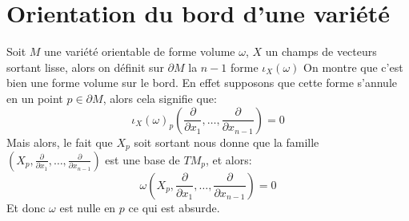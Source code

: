    \section{Orientation du bord d'une variété}
      Soit $M$ une variété orientable de forme volume $\omega$, $X$ un champs de vecteurs sortant lisse, alors on définit sur $\partial M$ la $n-1$ forme $\iota_X(\omega)$ On montre que c'est bien une forme volume sur le bord. En effet supposons que cette forme s’annule en un point $p \in \partial M$, alors cela signifie que:
      $$
         \iota_X(\omega)_p\left(\frac{\partial}{\partial x_1}, \ldots, \frac{\partial}{\partial x_{n-1}}\right) = 0
      $$
      Mais alors, le fait que $X_p$ soit sortant nous donne que la famille $(X_p, \frac{\partial}{\partial x_1}, \ldots, \frac{\partial}{\partial x_{n-1}})$ est une base de $TM_p$, et alors:
      $$
         \omega\left(X_p, \frac{\partial}{\partial x_1}, \ldots, \frac{\partial}{\partial x_{n-1}}\right) = 0
      $$  
      Et donc $\omega$ est nulle en $p$ ce qui est absurde.

